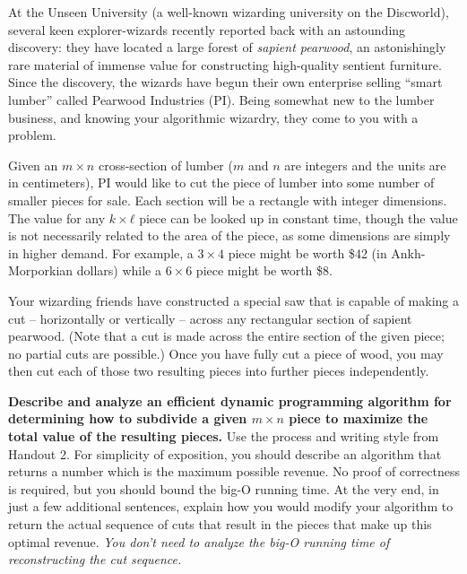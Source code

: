 \documentclass{ks-pset}
\begin{document}
\begin{problem}

  At the Unseen University (a well-known wizarding university on the
  Discworld), several keen explorer-wizards recently reported back with an
  astounding discovery: they have located a large forest of \emph{sapient
  pearwood}, an astonishingly rare material of immense value for constructing
  high-quality sentient furniture. Since the discovery, the wizards have begun
  their own enterprise selling ``smart lumber'' called Pearwood Industries
  (PI). Being somewhat new to the lumber business, and knowing your algorithmic
  wizardry, they come to you with a problem.

  Given an \(m×n\) cross-section of lumber (\(m\) and \(n\) are integers and
  the units are in centimeters), PI would like to cut the piece of lumber into
  some number of smaller pieces for sale.  Each section will be a rectangle
  with integer dimensions.  The value for any \(k×ℓ\) piece can be looked up in
  constant time, though the value is not necessarily related to the area of the
  piece, as some dimensions are simply in higher demand.  For example, a
  \(3×4\) piece might be worth \$42 (in Ankh-Morporkian dollars) while a
  \(6×6\) piece might be worth \$8.   

  Your wizarding friends have constructed a special saw that is capable of
  making a cut -- horizontally or vertically -- across any rectangular section
  of sapient pearwood.  (Note that a cut is made across the entire section of
  the given piece; no partial cuts are possible.) Once you have fully cut a
  piece of wood, you may then cut each of those two resulting pieces into
  further pieces independently.

  \textbf{Describe and analyze an efficient dynamic programming algorithm for
    determining how to subdivide a given \(m×n\) piece to maximize the total
  value of the resulting pieces.}  Use the process and writing style from
  Handout 2.  For simplicity of exposition, you should describe an algorithm
  that returns a number which is the maximum possible revenue.   No proof of
  correctness is required, but you should bound the big-O running time. At the
  very end,  in just a few additional sentences, explain how you would modify
  your algorithm to return the actual sequence of cuts that result in the
  pieces that make up this optimal revenue. \emph{You don't need to analyze the
  big-O running time of reconstructing the cut sequence.}

\end{problem}
\end{document}
